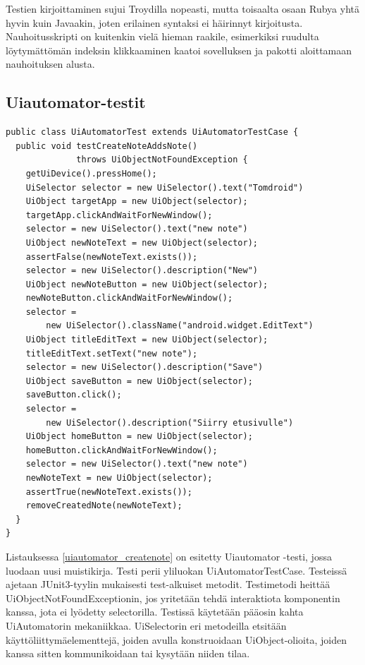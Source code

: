 Testien kirjoittaminen sujui Troydilla nopeasti, mutta toisaalta osaan Rubya yhtä hyvin kuin Javaakin, joten erilainen syntaksi ei häirinnyt kirjoitusta. Nauhoitusskripti on kuitenkin vielä hieman raakile, esimerkiksi ruudulta löytymättömän indeksin klikkaaminen kaatoi sovelluksen ja pakotti aloittamaan nauhoituksen alusta.

\subsection{Uiautomator-testit}

\begin{lstlisting}[float, label=uiautomator_createnote,caption=Muistikirjan luontitesti Uiautomatorilla]
public class UiAutomatorTest extends UiAutomatorTestCase {
  public void testCreateNoteAddsNote() 
              throws UiObjectNotFoundException {
    getUiDevice().pressHome();
    UiSelector selector = new UiSelector().text("Tomdroid")
    UiObject targetApp = new UiObject(selector);
    targetApp.clickAndWaitForNewWindow();
    selector = new UiSelector().text("new note")
    UiObject newNoteText = new UiObject(selector);
    assertFalse(newNoteText.exists());
    selector = new UiSelector().description("New")
    UiObject newNoteButton = new UiObject(selector);
    newNoteButton.clickAndWaitForNewWindow();
    selector = 
        new UiSelector().className("android.widget.EditText")
    UiObject titleEditText = new UiObject(selector);
    titleEditText.setText("new note");
    selector = new UiSelector().description("Save")
    UiObject saveButton = new UiObject(selector);
    saveButton.click();
    selector = 
        new UiSelector().description("Siirry etusivulle")
    UiObject homeButton = new UiObject(selector);
    homeButton.clickAndWaitForNewWindow();
    selector = new UiSelector().text("new note")
    newNoteText = new UiObject(selector);
    assertTrue(newNoteText.exists());  
    removeCreatedNote(newNoteText);
  }
}
\end{lstlisting}

Listauksessa \ref{uiautomator_createnote} on esitetty Uiautomator -testi, jossa luodaan uusi muistikirja. Testi perii yliluokan UiAutomatorTestCase. Testeissä ajetaan JUnit3-tyylin mukaisesti test-alkuiset metodit. Testimetodi heittää UiObjectNotFoundExceptionin, jos yritetään tehdä interaktiota komponentin kanssa, jota ei lyödetty selectorilla. Testissä käytetään pääosin kahta UiAutomatorin mekaniikkaa. UiSelectorin eri metodeilla etsitään käyttöliittymäelementtejä, joiden avulla konstruoidaan UiObject-olioita, joiden kanssa sitten kommunikoidaan tai kysytään niiden tilaa. 

